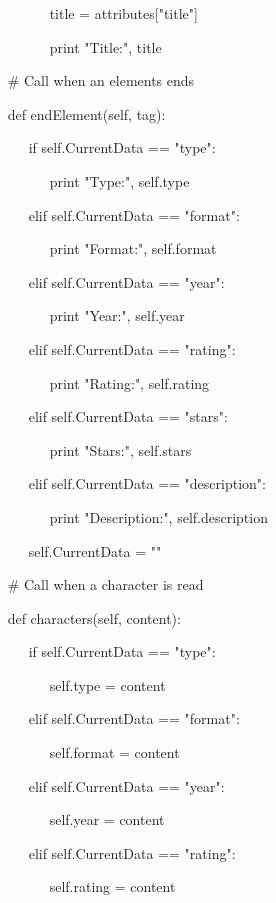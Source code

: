 ~~~~~~~~ title = attributes["title"] \par
\noindent 
~~~~~~~~ print "Title:", title \par
\vspace{12pt}
\noindent 
~~  $  \#  $ Call when an elements ends \par
\noindent 
~~ def endElement(self, tag): \par
\noindent 
~~~~~ if self.CurrentData == "type": \par
\noindent 
~~~~~~~~ print "Type:", self.type \par
\noindent 
~~~~~ elif self.CurrentData == "format": \par
\noindent 
~~~~~~~~ print "Format:", self.format \par
\noindent 
~~~~~ elif self.CurrentData == "year": \par
\noindent 
~~~~~~~~ print "Year:", self.year \par
\noindent 
~~~~~ elif self.CurrentData == "rating": \par
\noindent 
~~~~~~~~ print "Rating:", self.rating \par
\noindent 
~~~~~ elif self.CurrentData == "stars": \par
\noindent 
~~~~~~~~ print "Stars:", self.stars \par
\noindent 
~~~~~ elif self.CurrentData == "description": \par
\noindent 
~~~~~~~~ print "Description:", self.description \par
\noindent 
~~~~~ self.CurrentData = "" \par
\vspace{12pt}
\noindent 
~~  $  \#  $ Call when a character is read \par
\noindent 
~~ def characters(self, content): \par
\noindent 
~~~~~ if self.CurrentData == "type": \par
\noindent 
~~~~~~~~ self.type = content \par
\noindent 
~~~~~ elif self.CurrentData == "format": \par
\noindent 
~~~~~~~~ self.format = content \par
\noindent 
~~~~~ elif self.CurrentData == "year": \par
\noindent 
~~~~~~~~ self.year = content \par
\noindent 
~~~~~ elif self.CurrentData == "rating": \par
\noindent 
~~~~~~~~ self.rating = content \par
